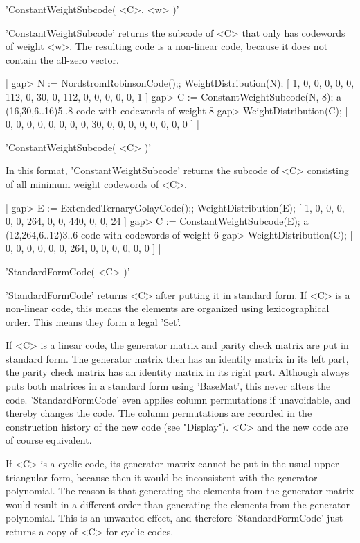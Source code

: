 
'ConstantWeightSubcode( <C>, <w> )'

'ConstantWeightSubcode'   returns  the subcode  of   <C>   that only  has
codewords of weight <w>. The resulting code is a non-linear code, because
it does not contain the all-zero vector.

|    gap> N := NordstromRobinsonCode();; WeightDistribution(N);
    [ 1, 0, 0, 0, 0, 0, 112, 0, 30, 0, 112, 0, 0, 0, 0, 0, 1 ]
    gap> C := ConstantWeightSubcode(N, 8);
    a (16,30,6..16)5..8 code with codewords of weight 8
    gap> WeightDistribution(C);
    [ 0, 0, 0, 0, 0, 0, 0, 0, 30, 0, 0, 0, 0, 0, 0, 0, 0 ] |

'ConstantWeightSubcode( <C> )'

In this   format, 'ConstantWeightSubcode'  returns   the  subcode of  <C>
consisting of all minimum weight codewords of <C>.

|    gap> E := ExtendedTernaryGolayCode();; WeightDistribution(E);
    [ 1, 0, 0, 0, 0, 0, 264, 0, 0, 440, 0, 0, 24 ]
    gap> C := ConstantWeightSubcode(E);
    a (12,264,6..12)3..6 code with codewords of weight 6
    gap> WeightDistribution(C);
    [ 0, 0, 0, 0, 0, 0, 264, 0, 0, 0, 0, 0, 0 ] |


'StandardFormCode( <C> )'

'StandardFormCode' returns <C> after putting it  in standard form. If <C>
is a  non-linear  code, this  means   the elements  are  organized  using
lexicographical order. This means they form a legal {\GAP} 'Set'.

If <C> is a linear code, the generator matrix and parity check matrix are
put in standard form. The generator matrix then has an identity matrix in
its left  part, the  parity check  matrix has an  identity matrix  in its
right  part. Although {\GUAVA}  always puts both  matrices  in a standard
form using 'BaseMat', this never alters the code. 'StandardFormCode' even
applies column permutations  if   unavoidable, and thereby   changes  the
code. The column permutations are recorded in the construction history of
the  new  code (see  "Display").  <C> and  the   new code are  of  course
equivalent.

If <C> is a cyclic code, its generator matrix cannot be  put in the usual
upper   triangular form, because then  it  would be inconsistent with the
generator polynomial. The reason is that generating the elements from the
generator matrix  would result in a different  order than  generating the
elements from the generator polynomial.  This is an unwanted effect,  and
therefore 'StandardFormCode' just returns a copy of <C> for cyclic codes.

